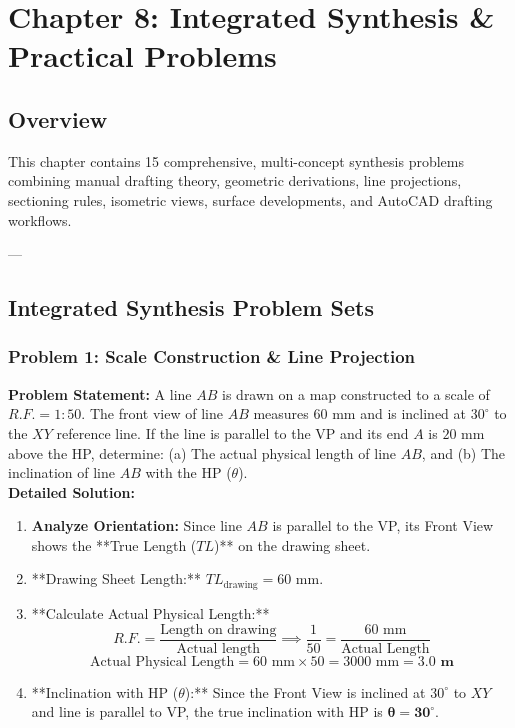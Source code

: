 \chapter{Chapter 8: Integrated Synthesis \& Practical Problems}

\section{Overview}
This chapter contains 15 comprehensive, multi-concept synthesis problems combining manual drafting theory, geometric derivations, line projections, sectioning rules, isometric views, surface developments, and AutoCAD drafting workflows.

---

\section{Integrated Synthesis Problem Sets}

\subsection{Problem 1: Scale Construction \& Line Projection}
\textbf{Problem Statement:} A line $AB$ is drawn on a map constructed to a scale of $R.F. = 1:50$. The front view of line $AB$ measures $60\text{ mm}$ and is inclined at $30^\circ$ to the $XY$ reference line. If the line is parallel to the VP and its end $A$ is $20\text{ mm}$ above the HP, determine: (a) The actual physical length of line $AB$, and (b) The inclination of line $AB$ with the HP ($\theta$).\\[4pt]
\textbf{Detailed Solution:}
\begin{enumerate}
    \item \textbf{Analyze Orientation:} Since line $AB$ is parallel to the VP, its Front View shows the **True Length ($TL$)** on the drawing sheet.
    \item **Drawing Sheet Length:** $TL_{\text{drawing}} = 60\text{ mm}$.
    \item **Calculate Actual Physical Length:**
    $$R.F. = \frac{\text{Length on drawing}}{\text{Actual length}} \implies \frac{1}{50} = \frac{60\text{ mm}}{\text{Actual Length}}$$
    $$\text{Actual Physical Length} = 60\text{ mm} \times 50 = 3000\text{ mm} = \mathbf{3.0\text{ m}}$$
    \item **Inclination with HP ($\theta$):** Since the Front View is inclined at $30^\circ$ to $XY$ and line is parallel to VP, the true inclination with HP is $\mathbf{\theta = 30^\circ}$.
\end{enumerate}

